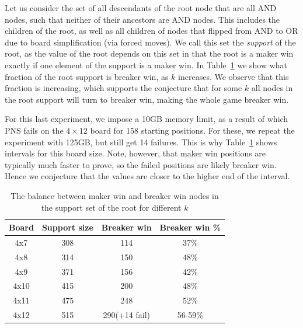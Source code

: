 \documentclass[conference]{IEEEtran}
\theoremstyle{definition}
\begin{document}
Let us consider the set of all descendants of the root node that are all AND nodes, such that neither of their ancestors are AND nodes. This includes the children of the root, as well as all children of nodes that flipped from AND to OR due to board simplification (via forced moves). We call this set the \emph{support} of the root, as the value of the root depends on this set in that the root is a maker win exactly if one element of the support is a maker win. In Table~\ref{tab:balance} we show what fraction of the root support is breaker win, as $k$ increases. We observe that this fraction is increasing, which supports the conjecture that for some $k$ all nodes in the root support will turn to breaker win, making the whole game breaker win. 

For this last experiment, we impose a 10GB memory limit, as a result of which PNS fails on the $4\times 12$ board for 158 starting positions. For these, we repeat the experiment with 125GB, but still get 14 failures. This is why Table~\ref{tab:balance} shows intervals for this board size. Note, however, that maker win positions are typically much faster to prove, so the failed positions are likely breaker win. Hence we conjecture that the values are closer to the higher end of the interval.

\begin{table}[htbp]
\caption{The balance between maker win and breaker win nodes in the support set of the root for different $k$}
\begin{center}
\begin{tabular}{ c | c c c }
\hline
\textbf{Board} & \textbf{Support size} & \textbf{Breaker win}  & \textbf{Breaker win \%}\\
\hline 
4x7 & 308 & 114 & 37\% \\
4x8 & 314 & 150 & 48\% \\
4x9 & 371 & 156 & 42\% \\
4x10 & 415  & 200 & 48\% \\
4x11 & 475  & 248 & 52\% \\
4x12 & 515  & 290(+14 fail) & 56-59\% \\
\hline
\end{tabular}
\label{tab:balance}
\end{center}
\end{table}
\end{document}
